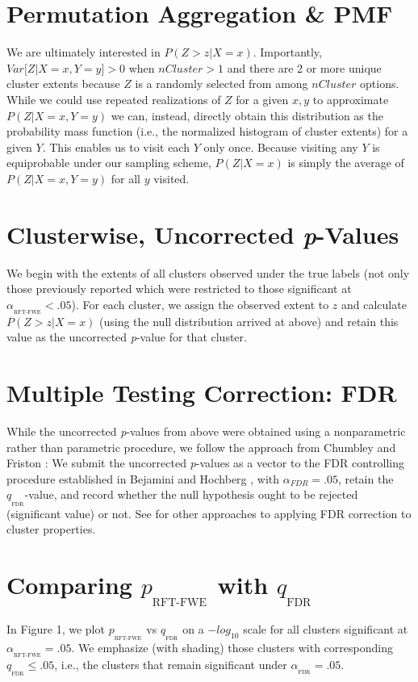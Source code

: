 \documentclass{article}
\newcommand{\subtext}[2]{
#1_{_{\text{#2}}}
}
\begin{document}
\section{Permutation Aggregation \& PMF}
We are ultimately interested in $P(Z>z|X=x)$.
Importantly, $Var \big[ Z|X=x,Y=y \big] > 0$  when $nCluster>1$ and there are 2 or more unique cluster extents because $Z$ is a randomly selected from among $nCluster$ options.
While we could use repeated realizations of $Z$ for a given $x,y$ to approximate $P(Z|X=x,Y=y)$ we can, instead, directly obtain this distribution as the probability mass function (i.e., the normalized histogram of cluster extents) for a given $Y$.
This enables us to visit each $Y$ only once.
Because visiting any $Y$ is equiprobable under our sampling scheme, $P(Z|X=x)$ is simply the average of $P(Z|X=x,Y=y)$ for all $y$ visited.

\section{Clusterwise, Uncorrected \textit{p}-Values}

We begin with the extents of all clusters observed under the true labels (not only those previously reported which were restricted to those significant at $\subtext{\alpha}{RFT-FWE}<.05$).
For each cluster, we assign the observed extent to $z$ and calculate $P(Z>z|X=x)$ (using the null distribution arrived at above) and retain this value as the uncorrected \textit{p}-value for that cluster.

\section{Multiple Testing Correction: FDR}

While the uncorrected \textit{p}-values from above were obtained using a nonparametric rather than parametric procedure, we follow the approach from Chumbley and Friston \cite{chumbley_false_2009}: We submit the uncorrected \textit{p}-values as a vector to the FDR controlling procedure established in Bejamini and Hochberg \cite{benjamini_controlling_1995}, with $\alpha_{FDR}=.05$, retain the $\subtext{q}{FDR}$-value, and record whether the null hypothesis ought to be rejected (significant value) or not.
See \cite{chumbley_false_2009,heller_cluster-based_2006,chumbley_topological_2010} for other approaches to applying FDR correction to cluster properties.

\section{Comparing $\subtext{p}{RFT-FWE}$ with $\subtext{q}{FDR}$}
In Figure 1, we plot $\subtext{p}{RFT-FWE}$ vs $\subtext{q}{FDR}$ on a $-log_{10}$ scale for all clusters significant at $\subtext{\alpha}{RFT-FWE}=.05$.
We emphasize (with shading) those clusters with corresponding $\subtext{q}{FDR}\leq .05$, i.e., the clusters that remain significant under $\subtext{\alpha}{FDR}=.05$.




\end{document}

